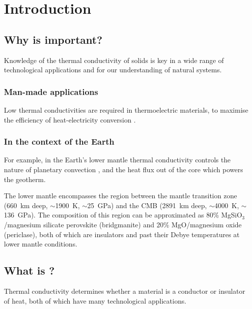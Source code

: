 \chapter{Introduction} %

\label{Chapter1} %



\section{Why is \tcs important?}
Knowledge of the thermal conductivity of solids is key in a wide range of technological applications and for our understanding of natural systems.

\subsection{Man-made applications}
Low thermal conductivities are required in thermoelectric materials, to maximise the efficiency of heat-electricity conversion \citep{Snyder2008}.

\subsection{In the context of the Earth}
For example, in the Earth's lower mantle thermal conductivity controls the nature of planetary convection \citep{Tosi2013}, and the heat flux out of the core which powers the geotherm. 

The lower mantle encompasses the region between the mantle transition zone (660~km deep, $\sim$1900~K, $\sim$25~GPa) and the CMB (2891~km deep, $\sim$4000~K, $\sim$136~GPa). The composition of this region can be approximated as 80\% MgSiO$_3$/magnesium silicate perovskite (bridgmanite) and 20\% MgO/magnesium oxide (periclase), both of which are insulators and past their Debye temperatures at lower mantle conditions.



\section{What is \tc?}
Thermal conductivity determines whether a material is a conductor or insulator of heat, both of which have many technological applications.

